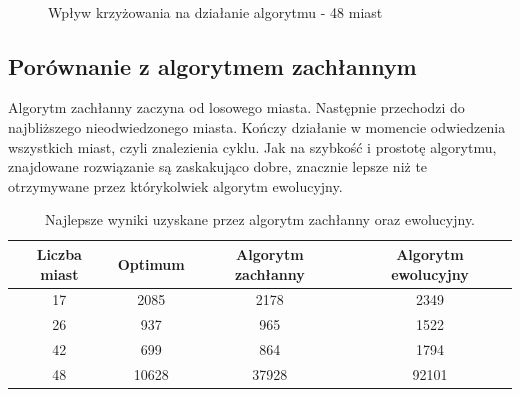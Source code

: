 \documentclass[12pt, a4paper]{article}
\begin{document}
\begin{figure}[H]
\centering
\mbox{\quad
{} 
}
\caption{Wpływ krzyżowania na działanie algorytmu - 48 miast}
\end{figure}

\subsection{Porównanie z algorytmem zachłannym}

Algorytm zachłanny zaczyna od losowego miasta. Następnie przechodzi do najbliższego 
nieodwiedzonego miasta. Kończy działanie w momencie odwiedzenia wszystkich miast, czyli
znalezienia cyklu. Jak na szybkość i prostotę algorytmu, znajdowane rozwiązanie są zaskakująco 
dobre, znacznie lepsze niż te otrzymywane przez którykolwiek algorytm ewolucyjny.

\begin{table}[h]
\centering
	\begin{tabular}{ | c | c | c | c | } 
		\hline
  		Liczba miast & Optimum & Algorytm zachłanny & Algorytm ewolucyjny \\
  		\hline
  		17 & 2085 & 2178 & 2349 \\
  		\hline
  		26 & 937 & 965 & 1522\\
  		\hline
  		42 & 699 & 864 & 1794\\
  		\hline
  		48 & 10628 & 37928 & 92101\\
  		\hline
	\end{tabular}
\caption{Najlepsze wyniki uzyskane przez algorytm zachłanny oraz ewolucyjny.}
\end{table}
\end{document}
